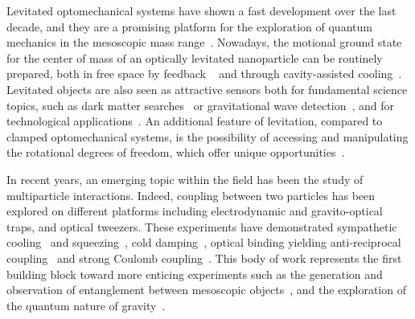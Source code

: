 \documentclass[aps,preprint,singlecolumn,nopacs,superscriptaddress,groupedaddress]{revtex4}
\begin{document}
\maketitle
Levitated optomechanical systems have shown a fast development over the last decade, and they are a promising platform for the exploration of quantum mechanics in the mesoscopic mass range~\cite{Millen2020Optomechanics,Bassi2013Models}.  Nowadays, the motional ground state for the center of mass of an optically levitated nanoparticle can be routinely prepared, both in free space by feedback ~\cite{Magrini2021,novotny2021_GS,Kamba2022Optical} and through cavity-assisted cooling~\cite{Delic2020science,Ranfagni2021Two-dimensional,Piotrowski2023Simultaneous,Deplano2024Highpurity}. Levitated objects are also seen as attractive sensors both for fundamental science topics, such as dark matter searches~\cite{Monteiro2020Search,Moore2021Searching, Kilian2024Darkmatter} or gravitational wave detection~\cite{Arvanitaki2013Detecting,Aggarwal2022Searching}, and for technological applications~\cite{Monteiro2017Optical,Rademacher2019Quantum,Ahrens2024Levitated}. An additional feature of levitation, compared to clamped optomechanical systems, is the possibility of accessing and manipulating the rotational degrees of freedom, which offer unique opportunities~\cite{Muddassar2018Precession,tongcangli_5D,novotny_libration_fbk2021,Pontin2023Simultaneous,Zielinska2023Controlling}. 

In recent years, an emerging topic within the field has been the study of multiparticle interactions.  Indeed, coupling between two particles has been explored on different platforms including electrodynamic and gravito-optical traps, and optical tweezers. These experiments have demonstrated sympathetic cooling~\cite{Arita2022Alloptical,Lika2023Colddamping, penny2023Sympathetic, Bykov2023_3Dsympathetic} and squeezing~\cite{penny2023Sympathetic}, cold damping~\cite{Vijayan2022Scalable}, optical binding yielding anti-reciprocal coupling~\cite{Rieser2022Tunable} and strong Coulomb coupling~\cite{Deplano2024Coulomb}. This body of work represents the first building block toward more enticing experiments  such as the generation and observation of entanglement between mesoscopic objects~\cite{Chauhan2020Stationary,Brando2021Coherent,Winkler2024Steady-state}, and the exploration of the quantum nature of gravity~\cite{Bose2017spin}.
\end{document}
